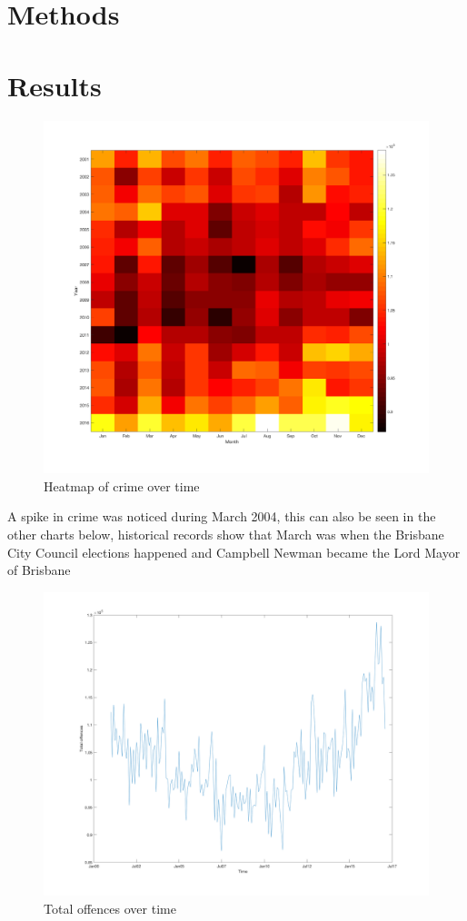 \documentclass[]{article}
\begin{document}
\section{Methods}

\section{Results}

\begin{figure}[H]
    \caption{Heatmap of crime over time}
    \centering
    \includegraphics[width=\linewidth]{../images/crime_time_heatmap}
\end{figure}

A spike in crime was noticed during March 2004, this can also be seen in the other  charts below, historical records show that March was when the Brisbane City Council elections happened and Campbell Newman became the Lord Mayor of Brisbane\cite{noauthor_2004_2017}

\begin{figure}[H]
    \caption{Total offences over time}
    \centering
    \includegraphics[width=\linewidth]{../images/crime_over_time}
\end{figure}
\end{document}
